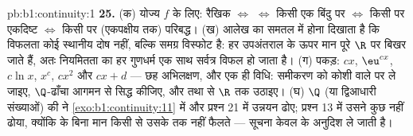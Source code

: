 \begin{solution}{pb:b1:continuity:1}
\textbf{25.} (क) योज्य $f$ के लिए: रैखिक $\iff$  $\iff$ किसी एक बिंदु पर
 $\iff$ किसी  पर एकदिष्ट $\iff$ किसी  पर (एकपक्षीय तक)
परिबद्ध। (ख) आलेख का समतल में  होना दिखाता है कि विफलता कोई स्थानीय दोष
नहीं, बल्कि समग्र विस्फोट है: हर उपअंतराल के ऊपर मान पूरे $\R$ पर बिखर जाते
हैं, अतः नियमितता का हर गुणधर्म एक साथ सर्वत्र विफल हो जाता है। (ग) पकड़:
$cx$, $\eu^{cx}$, $c\ln x$, $x^c$, $cx^2$ और $cx + d$ --- छह अभिलक्षण, और एक
ही विधि: समीकरण को कोशी वाले पर ले जाइए, $\Q$-ढाँचा आगमन से सिद्ध कीजिए, और
 तथा  से $\R$ तक उठाइए। (घ) $\Q$ (या द्विआधारी संख्याओं) की
 ने \cref{exo:b1:continuity:11} में और प्रश्न 21 में उन्नयन ढोए; प्रश्न
13 में उसने कुछ नहीं ढोया, क्योंकि  के बिना मान किसी   से
उसके  तक नहीं फैलते ---  सूचना केवल  के अनुदिश ले जाती है।
\end{solution}
